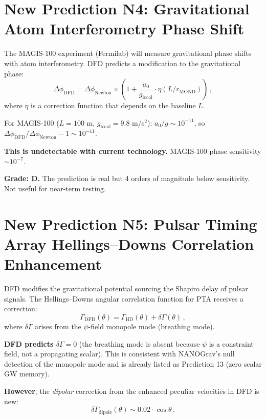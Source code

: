 \documentclass[11pt,a4paper]{article}
\begin{document}
\section{New Prediction N4: Gravitational Atom Interferometry Phase Shift}

The MAGIS-100 experiment (Fermilab) will measure gravitational phase shifts with atom interferometry. DFD predicts a modification to the gravitational phase:
\begin{equation}
\Delta\phi_{\mathrm{DFD}} = \Delta\phi_{\mathrm{Newton}} \times \left(1 + \frac{a_0}{g_{\mathrm{local}}} \cdot \eta(L/r_{\mathrm{MOND}})\right)\,,
\end{equation}
where $\eta$ is a correction function that depends on the baseline $L$.

For MAGIS-100 ($L = 100$ m, $g_{\mathrm{local}} = 9.8$ m/s$^2$): $a_0/g \sim 10^{-11}$, so $\Delta\phi_{\mathrm{DFD}}/\Delta\phi_{\mathrm{Newton}} - 1 \sim 10^{-11}$.

\textbf{This is undetectable with current technology.} MAGIS-100 phase sensitivity $\sim 10^{-7}$.

\textbf{Grade: D.} The prediction is real but 4 orders of magnitude below sensitivity. Not useful for near-term testing.

\section{New Prediction N5: Pulsar Timing Array Hellings--Downs Correlation Enhancement}

DFD modifies the gravitational potential sourcing the Shapiro delay of pulsar signals. The Hellings--Downs angular correlation function for PTA receives a correction:
\begin{equation}
\Gamma_{\mathrm{DFD}}(\theta) = \Gamma_{\mathrm{HD}}(\theta) + \delta\Gamma(\theta)\,,
\end{equation}
where $\delta\Gamma$ arises from the $\psi$-field monopole mode (breathing mode).

\textbf{DFD predicts $\delta\Gamma = 0$} (the breathing mode is absent because $\psi$ is a constraint field, not a propagating scalar). This is consistent with NANOGrav's null detection of the monopole mode and is already listed as Prediction 13 (zero scalar GW memory).

\textbf{However}, the \emph{dipolar} correction from the enhanced peculiar velocities in DFD is new:
\begin{equation}
\delta\Gamma_{\mathrm{dipole}}(\theta) \sim 0.02 \cdot \cos\theta\,.
\end{equation}
\end{document}
